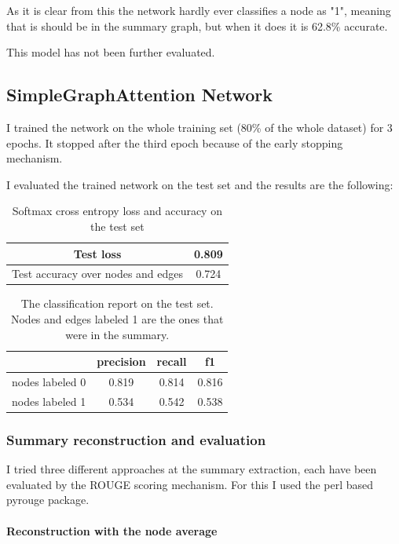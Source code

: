 As it is clear from this the network hardly ever classifies a node as "1", meaning that is should be in the summary graph, but when it does it is 62.8\% accurate.

This model has not been further evaluated.

\subsection{SimpleGraphAttention Network}
I trained the network on the whole training set (80\% of the whole dataset) for 3 epochs. It stopped after the third epoch because of the early stopping mechanism.

I evaluated the trained network on the test set and the results are the following:

\begin{table}[!h]
	\centering
	\begin{tabular}{| c | c |}
		\hline
		Test loss & 0.809 \\ \hline
		Test accuracy over nodes and edges& 0.724 \\ \hline
	\end{tabular}
	\caption{Softmax cross entropy loss and accuracy on the test set}
\end{table}

\begin{table}[!h]
	\centering
	\begin{tabular}{| c | c | c | c |}
		\hline
		& precision & recall & f1 \\ \hline \hline
		nodes labeled 0 & 0.819 & 0.814 & 0.816 \\ \hline
		nodes labeled 1 & 0.534 & 0.542 & 0.538 \\ \hline
	\end{tabular}
	\caption{The classification report on the test set. Nodes and edges labeled 1 are the ones that were in the summary.}
\end{table}

\subsubsection{Summary reconstruction and evaluation}
I tried three different approaches at the summary extraction, each have been evaluated by the ROUGE scoring mechanism. For this I used the perl based pyrouge package.

\paragraph{Reconstruction with the node average}

